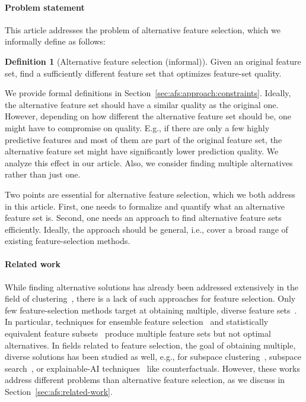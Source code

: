 \documentclass{article}
\theoremstyle{definition}
\newtheorem{definition}{Definition}
\begin{document}
\paragraph{Problem statement}

This article addresses the problem of alternative feature selection, which we informally define as follows:
%
\begin{definition}[Alternative feature selection (informal)]
	Given an original feature set, find a sufficiently different feature set that optimizes feature-set quality.
	\label{def:afs:alternative-feature-selection}
\end{definition}
%
We provide formal definitions in Section~\ref{sec:afs:approach:constraints}.
Ideally, the alternative feature set should have a similar quality as the original one.
However, depending on how different the alternative feature set should be, one might have to compromise on quality.
E.g., if there are only a few highly predictive features and most of them are part of the original feature set, the alternative feature set might have significantly lower prediction quality.
We analyze this effect in our article.
Also, we consider finding multiple alternatives rather than just one.

Two points are essential for alternative feature selection, which we both address in this article.
First, one needs to formalize and quantify what an alternative feature set is.
Second, one needs an approach to find alternative feature sets efficiently.
Ideally, the approach should be general, i.e., cover a broad range of existing feature-selection methods.

\paragraph{Related work}

While finding alternative solutions has already been addressed extensively in the field of clustering~\cite{bailey2014alternative}, there is a lack of such approaches for feature selection.
Only few feature-selection methods target at obtaining multiple, diverse feature sets~\cite{borboudakis2021extending, siddiqi2020genetic}.
In particular, techniques for ensemble feature selection~\cite{saeys2008robust, seijo2017ensemble} and statistically equivalent feature subsets~\cite{lagani2017feature} produce multiple feature sets but not optimal alternatives.
In fields related to feature selection, the goal of obtaining multiple, diverse solutions has been studied as well, e.g., for subspace clustering~\cite{mueller2009relevant}, subspace search~\cite{trittenbach2019dimension}, or explainable-AI techniques~\cite{artelt2022even, kim2016examples, mothilal2020explaining, russell2019efficient} like counterfactuals.
However, these works address different problems than alternative feature selection, as we discuss in Section~\ref{sec:afs:related-work}.
\end{document}

